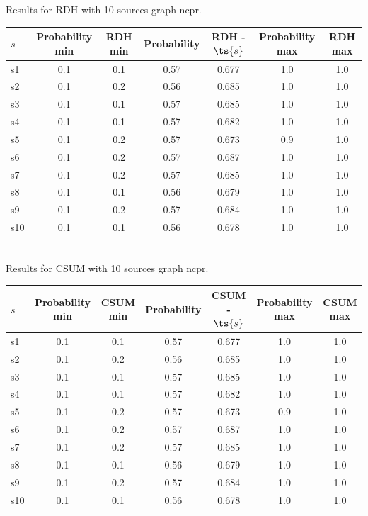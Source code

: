 \documentclass{article}
\begin{document}
\noindent Results for RDH with 10 sources graph ncpr.

\noindent\begin{tabular}{|l|c|c|c|c|c|c|}
\hline
$s$& Probability min & RDH min & Probability & RDH - $\ts{s}$ & Probability max & RDH max\\
\hline
s1 &0.1 & 0.1 & 0.57 & 0.677 & 1.0 & 1.0\\
\hline
s2 &0.1 & 0.2 & 0.56 & 0.685 & 1.0 & 1.0\\
\hline
s3 &0.1 & 0.1 & 0.57 & 0.685 & 1.0 & 1.0\\
\hline
s4 &0.1 & 0.1 & 0.57 & 0.682 & 1.0 & 1.0\\
\hline
s5 &0.1 & 0.2 & 0.57 & 0.673 & 0.9 & 1.0\\
\hline
s6 &0.1 & 0.2 & 0.57 & 0.687 & 1.0 & 1.0\\
\hline
s7 &0.1 & 0.2 & 0.57 & 0.685 & 1.0 & 1.0\\
\hline
s8 &0.1 & 0.1 & 0.56 & 0.679 & 1.0 & 1.0\\
\hline
s9 &0.1 & 0.2 & 0.57 & 0.684 & 1.0 & 1.0\\
\hline
s10 &0.1 & 0.1 & 0.56 & 0.678 & 1.0 & 1.0\\
\hline
\end{tabular}\\

\noindent Results for CSUM with 10 sources graph ncpr.

\noindent\begin{tabular}{|l|c|c|c|c|c|c|}
\hline
$s$& Probability min & CSUM min & Probability & CSUM - $\ts{s}$ & Probability max & CSUM max\\
\hline
s1 &0.1 & 0.1 & 0.57 & 0.677 & 1.0 & 1.0\\
\hline
s2 &0.1 & 0.2 & 0.56 & 0.685 & 1.0 & 1.0\\
\hline
s3 &0.1 & 0.1 & 0.57 & 0.685 & 1.0 & 1.0\\
\hline
s4 &0.1 & 0.1 & 0.57 & 0.682 & 1.0 & 1.0\\
\hline
s5 &0.1 & 0.2 & 0.57 & 0.673 & 0.9 & 1.0\\
\hline
s6 &0.1 & 0.2 & 0.57 & 0.687 & 1.0 & 1.0\\
\hline
s7 &0.1 & 0.2 & 0.57 & 0.685 & 1.0 & 1.0\\
\hline
s8 &0.1 & 0.1 & 0.56 & 0.679 & 1.0 & 1.0\\
\hline
s9 &0.1 & 0.2 & 0.57 & 0.684 & 1.0 & 1.0\\
\hline
s10 &0.1 & 0.1 & 0.56 & 0.678 & 1.0 & 1.0\\
\hline
\end{tabular}\\
\end{document}
